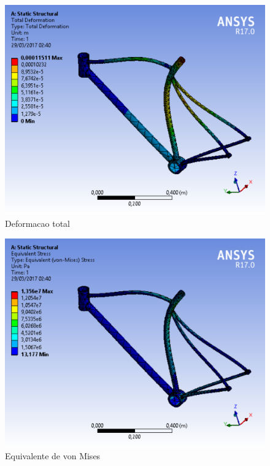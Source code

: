 \graphicspath{{figuras/}}
	\begin{figure}[h!]
	\centering
	\includegraphics[scale=0.80]{deformacao_total.png}
	\caption{Deformacao total}
	\label{img:deformacao_total}
	\end{figure}	
	
\graphicspath{{figuras/}}
	\begin{figure}[h!]
	\centering
	\includegraphics[scale=0.80]{equivalente_de_von_mises.png}
	\caption{Equivalente de von Mises}
	\label{img:equivalente_de_von_mises}
	\end{figure}	
	
